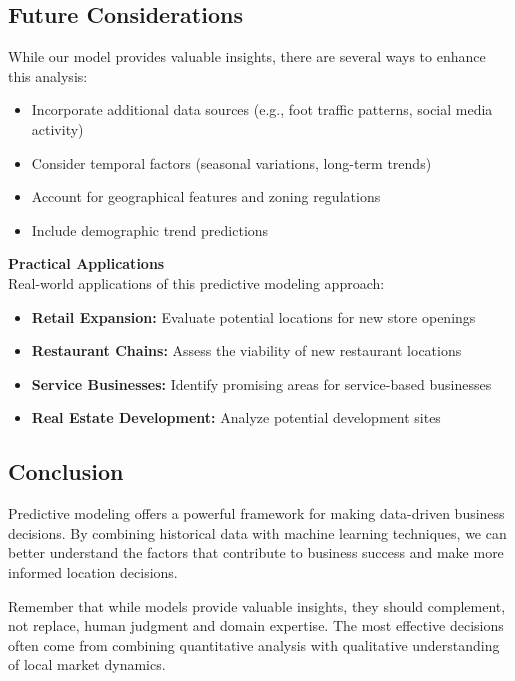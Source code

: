 \documentclass[
  letterpaper,
  DIV=11,
  numbers=noendperiod]{scrartcl}
\providecommand{\tightlist}{%
  \setlength{\itemsep}{0pt}\setlength{\parskip}{0pt}}\usepackage{longtable,booktabs,array}
\begin{document}
\subsection{Future Considerations}\label{future-considerations}

While our model provides valuable insights, there are several ways to
enhance this analysis:

\begin{itemize}
\tightlist
\item
  Incorporate additional data sources (e.g., foot traffic patterns,
  social media activity)
\item
  Consider temporal factors (seasonal variations, long-term trends)
\item
  Account for geographical features and zoning regulations
\item
  Include demographic trend predictions
\end{itemize}

\textbf{Practical Applications}\\
Real-world applications of this predictive modeling approach:

\begin{itemize}
\tightlist
\item
  \textbf{Retail Expansion:} Evaluate potential locations for new store
  openings\\
\item
  \textbf{Restaurant Chains:} Assess the viability of new restaurant
  locations\\
\item
  \textbf{Service Businesses:} Identify promising areas for
  service-based businesses\\
\item
  \textbf{Real Estate Development:} Analyze potential development
  sites\\
\end{itemize}

\subsection{Conclusion}\label{conclusion}

Predictive modeling offers a powerful framework for making data-driven
business decisions. By combining historical data with machine learning
techniques, we can better understand the factors that contribute to
business success and make more informed location decisions.

Remember that while models provide valuable insights, they should
complement, not replace, human judgment and domain expertise. The most
effective decisions often come from combining quantitative analysis with
qualitative understanding of local market dynamics.
\end{document}
